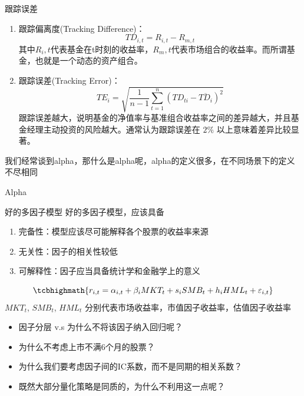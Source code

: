 \documentclass[12pt]{article}
\theoremstyle{definition}
\begin{document}
\begin{sdefinition}{跟踪误差}{}
\begin{enumerate}
	\item 跟踪偏离度(Tracking Difference)： $$ TD_{i,t} = R_{i,t} - R_{m,t}$$
	其中$R_i,t$代表基金在t时刻的收益率，$R_m,t$代表市场组合的收益率。而所谓基金，也就是一个动态的资产组合。
	\item 跟踪误差(Tracking Error)：$$
T E_i=\sqrt{\frac{1}{n-1} \sum_{t=1}^n\left(T D_{t i}-\overline{T D_i}\right)^2}
$$
跟踪误差越大，说明基金的净值率与基准组合收益率之间的差异越大，并且基金经理主动投资的风险越大。通常认为跟踪误差在 $2 \%$ 以上意味着差异比较显著。
\end{enumerate}
\end{sdefinition}
我们经常谈到alpha，那什么是alpha呢，alpha的定义很多，在不同场景下的定义不尽相同
\begin{sdefinition}{Alpha}{}

\end{sdefinition}

\begin{sdefinition}{好的多因子模型}{}
好的多因子模型，应该具备 
\begin{enumerate}
	\item 完备性：模型应该尽可能解释各个股票的收益率来源
	\item 无关性：因子的相关性较低
	\item 可解释性：因子应当具备统计学和金融学上的意义
\end{enumerate}
\end{sdefinition}

\begin{sexample}{}{}
$$
\tcbhighmath{r_{i, t}=\alpha_{i, t}+\beta_i M K T_t+s_i S M B_t+h_i H M L_t+\varepsilon_{i, t}}
$$
$MKT_t$, $SMB_t$, $HML_t$ 分别代表市场收益率，市值因子收益率，估值因子收益率
\end{sexample}




\begin{sremark}{}{}
\begin{itemize}
	\item 因子分层 v.s 为什么不将该因子纳入回归呢？
	\item 为什么不考虑上市不满6个月的股票？
	\item 为什么我们要考虑因子间的IC系数，而不是同期的相关系数？
	\item 既然大部分量化策略是同质的，为什么不利用这一点呢？
\end{itemize}
\end{sremark}
\end{document}
